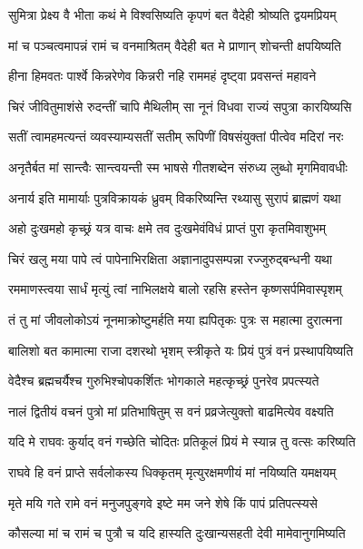 \twolineshloka
{सुमित्रा प्रेक्ष्य वै भीता कथं मे विश्वसिष्यति}
{कृपणं बत वैदेही श्रोष्यति द्वयमप्रियम्} %

\twolineshloka
{मां च पञ्चत्वमापन्नं रामं च वनमाश्रितम्}
{वैदेही बत मे प्राणान् शोचन्ती क्षपयिष्यति} %

\twolineshloka
{हीना हिमवतः पार्श्वे किन्नरेणेव किन्नरी}
{नहि राममहं दृष्ट्वा प्रवसन्तं महावने} %

\twolineshloka
{चिरं जीवितुमाशंसे रुदन्तीं चापि मैथिलीम्}
{सा नूनं विधवा राज्यं सपुत्रा कारयिष्यसि} %

\twolineshloka
{सतीं त्वामहमत्यन्तं व्यवस्याम्यसतीं सतीम्}
{रूपिणीं विषसंयुक्तां पीत्वेव मदिरां नरः} %

\twolineshloka
{अनृतैर्बत मां सान्त्वैः सान्त्वयन्ती स्म भाषसे}
{गीतशब्देन संरुध्य लुब्धो मृगमिवावधीः} %

\twolineshloka
{अनार्य इति मामार्याः पुत्रविक्रायकं ध्रुवम्}
{विकरिष्यन्ति रथ्यासु सुरापं ब्राह्मणं यथा} %

\twolineshloka
{अहो दुःखमहो कृच्छ्रं यत्र वाचः क्षमे तव}
{दुःखमेवंविधं प्राप्तं पुरा कृतमिवाशुभम्} %

\twolineshloka
{चिरं खलु मया पापे त्वं पापेनाभिरक्षिता}
{अज्ञानादुपसम्पन्ना रज्जुरुद्बन्धनी यथा} %

\twolineshloka
{रममाणस्त्वया सार्धं मृत्युं त्वां नाभिलक्षये}
{बालो रहसि हस्तेन कृष्णसर्पमिवास्पृशम्} %

\twolineshloka
{तं तु मां जीवलोकोऽयं नूनमाक्रोष्टुमर्हति}
{मया ह्यपितृकः पुत्रः स महात्मा दुरात्मना} %

\twolineshloka
{बालिशो बत कामात्मा राजा दशरथो भृशम्}
{स्त्रीकृते यः प्रियं पुत्रं वनं प्रस्थापयिष्यति} %

\twolineshloka
{वेदैश्च ब्रह्मचर्यैश्च गुरुभिश्चोपकर्शितः}
{भोगकाले महत्कृच्छ्रं पुनरेव प्रपत्स्यते} %

\twolineshloka
{नालं द्वितीयं वचनं पुत्रो मां प्रतिभाषितुम्}
{स वनं प्रव्रजेत्युक्तो बाढमित्येव वक्ष्यति} %

\twolineshloka
{यदि मे राघवः कुर्याद् वनं गच्छेति चोदितः}
{प्रतिकूलं प्रियं मे स्यान्न तु वत्सः करिष्यति} %

\twolineshloka
{राघवे हि वनं प्राप्ते सर्वलोकस्य धिक्कृतम्}
{मृत्युरक्षमणीयं मां नयिष्यति यमक्षयम्} %

\twolineshloka
{मृते मयि गते रामे वनं मनुजपुङ्गवे}
{इष्टे मम जने शेषे किं पापं प्रतिपत्स्यसे} %

\twolineshloka
{कौसल्या मां च रामं च पुत्रौ च यदि हास्यति}
{दुःखान्यसहती देवी मामेवानुगमिष्यति} %


